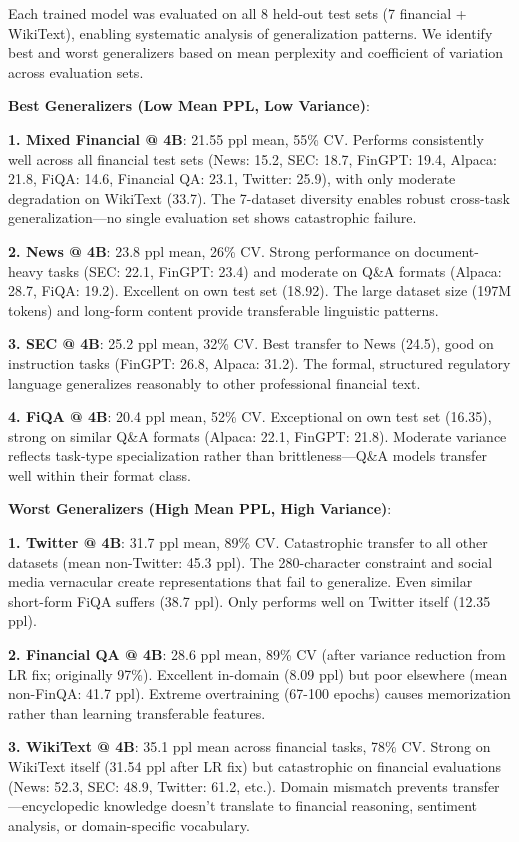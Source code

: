 Each trained model was evaluated on all 8 held-out test sets (7 financial + WikiText), enabling systematic analysis of generalization patterns. We identify best and worst generalizers based on mean perplexity and coefficient of variation across evaluation sets.

\textbf{Best Generalizers (Low Mean PPL, Low Variance)}:

\textbf{1. Mixed Financial @ 4B}: 21.55 ppl mean, 55\% CV. Performs consistently well across all financial test sets (News: 15.2, SEC: 18.7, FinGPT: 19.4, Alpaca: 21.8, FiQA: 14.6, Financial QA: 23.1, Twitter: 25.9), with only moderate degradation on WikiText (33.7). The 7-dataset diversity enables robust cross-task generalization—no single evaluation set shows catastrophic failure.

\textbf{2. News @ 4B}: 23.8 ppl mean, 26\% CV. Strong performance on document-heavy tasks (SEC: 22.1, FinGPT: 23.4) and moderate on Q\&A formats (Alpaca: 28.7, FiQA: 19.2). Excellent on own test set (18.92). The large dataset size (197M tokens) and long-form content provide transferable linguistic patterns.

\textbf{3. SEC @ 4B}: 25.2 ppl mean, 32\% CV. Best transfer to News (24.5), good on instruction tasks (FinGPT: 26.8, Alpaca: 31.2). The formal, structured regulatory language generalizes reasonably to other professional financial text.

\textbf{4. FiQA @ 4B}: 20.4 ppl mean, 52\% CV. Exceptional on own test set (16.35), strong on similar Q\&A formats (Alpaca: 22.1, FinGPT: 21.8). Moderate variance reflects task-type specialization rather than brittleness—Q\&A models transfer well within their format class.

\textbf{Worst Generalizers (High Mean PPL, High Variance)}:

\textbf{1. Twitter @ 4B}: 31.7 ppl mean, 89\% CV. Catastrophic transfer to all other datasets (mean non-Twitter: 45.3 ppl). The 280-character constraint and social media vernacular create representations that fail to generalize. Even similar short-form FiQA suffers (38.7 ppl). Only performs well on Twitter itself (12.35 ppl).

\textbf{2. Financial QA @ 4B}: 28.6 ppl mean, 89\% CV (after variance reduction from LR fix; originally 97\%). Excellent in-domain (8.09 ppl) but poor elsewhere (mean non-FinQA: 41.7 ppl). Extreme overtraining (67-100 epochs) causes memorization rather than learning transferable features.

\textbf{3. WikiText @ 4B}: 35.1 ppl mean across financial tasks, 78\% CV. Strong on WikiText itself (31.54 ppl after LR fix) but catastrophic on financial evaluations (News: 52.3, SEC: 48.9, Twitter: 61.2, etc.). Domain mismatch prevents transfer—encyclopedic knowledge doesn't translate to financial reasoning, sentiment analysis, or domain-specific vocabulary.

